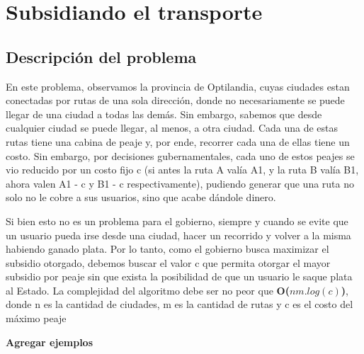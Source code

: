 \section{Subsidiando el transporte}

\subsection{Descripción del problema}
En este problema, observamos la provincia de Optilandia, cuyas ciudades estan conectadas por rutas de una sola dirección, donde no necesariamente se puede llegar de una ciudad a todas las demás. Sin embargo, sabemos que desde cualquier ciudad se puede llegar, al menos, a otra ciudad. Cada una de estas rutas tiene una cabina de peaje y, por ende, recorrer cada una de ellas tiene un costo. Sin embargo, por decisiones gubernamentales, cada uno de estos peajes se vio reducido por un costo fijo c (si antes la ruta A valía A1, y la ruta B valía B1, ahora valen A1 - c y B1 - c respectivamente), pudiendo generar que una ruta no solo no le cobre a sus usuarios, sino que acabe dándole dinero.
\\
\par
Si bien esto no es un problema para el gobierno, siempre y cuando se evite que un usuario pueda irse desde una ciudad, hacer un recorrido y volver a la misma habiendo ganado plata. Por lo tanto, como el gobierno busca maximizar el subsidio otorgado, debemos buscar el valor c que permita otorgar el mayor subsidio por peaje sin que exista la posibilidad de que un usuario le saque plata al Estado. La complejidad del algoritmo debe ser no peor que \textbf{O($nm.log(c)$)}, donde n es la cantidad de ciudades, m es la cantidad de rutas y c es el costo del máximo peaje
\\
\par

\textbf{Agregar ejemplos}
\\
\par
